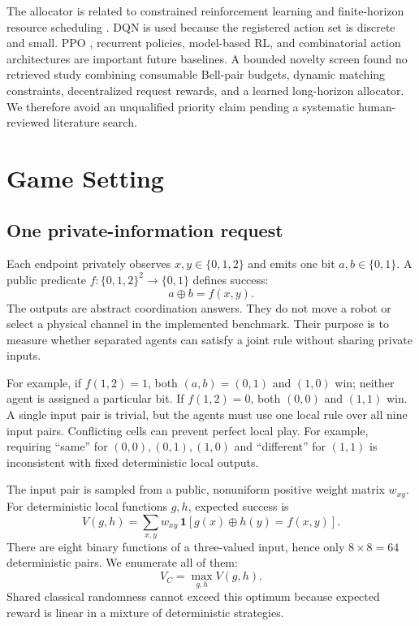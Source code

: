 \documentclass[10pt,twocolumn]{article}
\newcommand{\xor}{\mathbin{\oplus}}
\begin{document}
The allocator is related to constrained reinforcement learning and finite-horizon resource scheduling \cite{sutton2018reinforcement,mnih2015human}. DQN is used because the registered action set is discrete and small. PPO \cite{schulman2017proximal}, recurrent policies, model-based RL, and combinatorial action architectures are important future baselines. A bounded novelty screen found no retrieved study combining consumable Bell-pair budgets, dynamic matching constraints, decentralized request rewards, and a learned long-horizon allocator. We therefore avoid an unqualified priority claim pending a systematic human-reviewed literature search.

\section{Game Setting}
\subsection{One private-information request}
Each endpoint privately observes $x,y\in\{0,1,2\}$ and emits one bit $a,b\in\{0,1\}$. A public predicate $f:\{0,1,2\}^2\rightarrow\{0,1\}$ defines success:
\begin{equation}
  a\xor b=f(x,y).
  \label{eq:parity}
\end{equation}
The outputs are abstract coordination answers. They do not move a robot or select a physical channel in the implemented benchmark. Their purpose is to measure whether separated agents can satisfy a joint rule without sharing private inputs.

For example, if $f(1,2)=1$, both $(a,b)=(0,1)$ and $(1,0)$ win; neither agent is assigned a particular bit. If $f(1,2)=0$, both $(0,0)$ and $(1,1)$ win. A single input pair is trivial, but the agents must use one local rule over all nine input pairs. Conflicting cells can prevent perfect local play. For example, requiring ``same'' for $(0,0),(0,1),(1,0)$ and ``different'' for $(1,1)$ is inconsistent with fixed deterministic local outputs.

The input pair is sampled from a public, nonuniform positive weight matrix $w_{xy}$. For deterministic local functions $g,h$, expected success is
\begin{equation}
 V(g,h)=\sum_{x,y}w_{xy}\,\mathbf{1}\!\left[g(x)\xor h(y)=f(x,y)\right].
\end{equation}
There are eight binary functions of a three-valued input, hence only $8\times8=64$ deterministic pairs. We enumerate all of them:
\begin{equation}
 V_C=\max_{g,h}V(g,h).
 \label{eq:classical}
\end{equation}
Shared classical randomness cannot exceed this optimum because expected reward is linear in a mixture of deterministic strategies.
\end{document}
